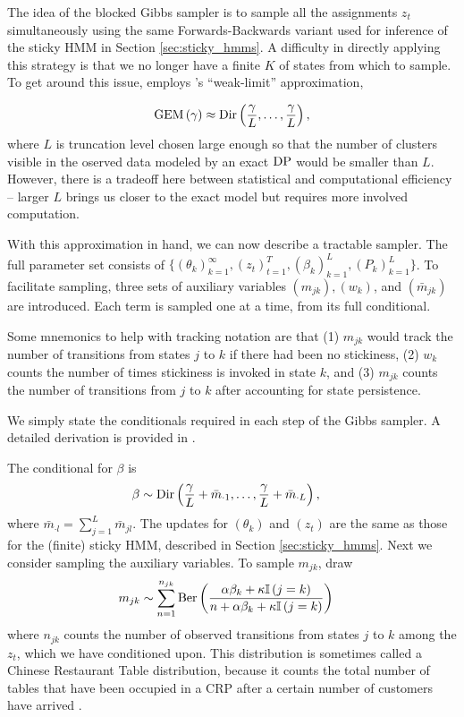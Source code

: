 \documentclass{article}
\begin{document}
The idea of the blocked Gibbs sampler is to sample all the assignments $z_t$
simultaneously using the same Forwards-Backwards variant used for inference of
the sticky HMM in Section \ref{sec:sticky_hmms}. A difficulty in directly
applying this strategy is that we no longer have a finite $K$ of states from
which to sample. To get around this issue, \citep{fox2008hdp} employs
\citep{ishwaran2002exact}'s ``weak-limit'' approximation,

\begin{align*}
  \text{GEM}\left(\gamma\right) \approx \textnormal{Dir}\left(\frac{\gamma}{L}, \dots, \frac{\gamma}{L}\right),
\end{align*}
where $L$ is truncation level chosen large enough so that the number of clusters
visible in the oserved data modeled by an exact $\textnormal{DP}$ would be smaller than $L$.
However, there is a tradeoff here between statistical and computational
efficiency -- larger $L$ brings us closer to the exact model but requires more
involved computation.

With this approximation in hand, we can now describe a tractable sampler. The
full parameter set consists of $\{\left(\theta_k\right)_{k = 1}^{\infty},
\left(z_t\right)_{t = 1}^{T}, \left(\beta_{k}\right)_{k = 1}^{L},
\left(P_{k}\right)_{k = 1}^{L} \}$. To facilitate sampling, three sets of
auxiliary variables $\left(m_{jk}\right), \left(w_k\right)$, and
  $\left(\bar{m}_{jk}\right)$ are introduced. Each term is sampled one at a
  time, from its full conditional.

Some mnemonics to help with tracking notation are that (1) $m_{jk}$ would track
the number of transitions from states $j$ to $k$ if there had been no
stickiness, (2) $w_k$ counts the number of times stickiness is invoked in state
$k$, and (3) $m_{jk}$ counts the number of transitions from $j$ to $k$ after
accounting for state persistence.

We simply state the conditionals required in each step of the Gibbs sampler. A
detailed derivation is provided in \citep{fox2009bayesian}.

The conditional for $\beta$ is
\begin{align*}
  \beta &\sim \textnormal{Dir}\left(\frac{\gamma}{L} + \bar{m}_{\cdot 1}, \dots, \frac{\gamma}{L} + \bar{m}_{\cdot L}\right),
\end{align*}
where $\bar{m}_{\cdot l} = \sum_{j = 1}^{L} \bar{m}_{jl}$. The updates for
$\left(\theta_k\right)$ and $\left(z_t\right)$ are the same as those for the
(finite) sticky HMM, described in Section \ref{sec:sticky_hmms}. Next we
consider sampling the auxiliary variables.
To sample $m_{jk}$, draw
\begin{align*}
  m_{jk} &\sim \sum_{n = 1}^{n_{jk}} \textnormal{Ber}\left(\frac{\alpha \beta_{k} + \kappa\mathbb{I}\left({j = k}\right)}{n + \alpha \beta_{k} + \kappa \mathbb{I}\left({j = k}\right)}\right)
\end{align*}
where $n_{jk}$ counts the number of observed transitions from states $j$ to $k$
among the $z_{t}$, which we have conditioned upon. This distribution is
sometimes called a Chinese Restaurant Table distribution, because it counts the
total number of tables that have been occupied in a CRP after a certain number
of customers have arrived \citep{zhou2012augment}.
\end{document}
